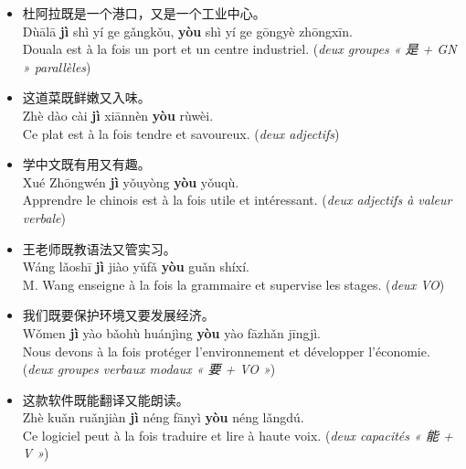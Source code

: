 \documentclass[11pt]{article}
\newcommand{\cle}[1]{{\popxbold\color{popdark}#1}}
\begin{document}
\begin{exemplebox}
\begin{itemize}
\item 杜阿拉\cle{既}是一个港口，\cle{又}是一个工业中心。\\
Dùālā \textbf{jì} shì yí ge gǎngkǒu, \textbf{yòu} shì yí ge gōngyè zhōngxīn.\\
Douala est à la fois un port et un centre industriel. \quad(\textit{deux groupes « 是 + GN » parallèles})
\item 这道菜\cle{既}鲜嫩\cle{又}入味。\\
Zhè dào cài \textbf{jì} xiānnèn \textbf{yòu} rùwèi.\\
Ce plat est à la fois tendre et savoureux. \quad(\textit{deux adjectifs})
\item 学中文\cle{既}有用\cle{又}有趣。\\
Xué Zhōngwén \textbf{jì} yǒuyòng \textbf{yòu} yǒuqù.\\
Apprendre le chinois est à la fois utile et intéressant. \quad(\textit{deux adjectifs à valeur verbale})
\end{itemize}
\end{exemplebox}

\begin{exemplebox}
\begin{itemize}
\item 王老师\cle{既}教语法\cle{又}管实习。\\
Wáng lǎoshī \textbf{jì} jiào yǔfǎ \textbf{yòu} guǎn shíxí.\\
M. Wang enseigne à la fois la grammaire et supervise les stages. \quad(\textit{deux VO})
\item 我们\cle{既}要保护环境\cle{又}要发展经济。\\
Wǒmen \textbf{jì} yào bǎohù huánjìng \textbf{yòu} yào fāzhǎn jīngjì.\\
Nous devons à la fois protéger l'environnement et développer l'économie. \quad(\textit{deux groupes verbaux modaux « 要 + VO »})
\item 这款软件\cle{既}能翻译\cle{又}能朗读。\\
Zhè kuǎn ruǎnjiàn \textbf{jì} néng fānyì \textbf{yòu} néng lǎngdú.\\
Ce logiciel peut à la fois traduire et lire à haute voix. \quad(\textit{deux capacités « 能 + V »})
\end{itemize}
\end{exemplebox}
\end{document}
